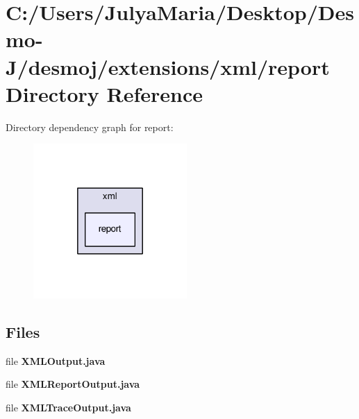\section{C\-:/\-Users/\-Julya\-Maria/\-Desktop/\-Desmo-\/\-J/desmoj/extensions/xml/report Directory Reference}
\label{dir_ec3be33de27843607b57d2c63dd0a21b}
Directory dependency graph for report\-:
\nopagebreak
\begin{figure}[H]
\begin{center}
\leavevmode
\includegraphics[width=166pt]{dir_ec3be33de27843607b57d2c63dd0a21b_dep}
\end{center}
\end{figure}
\subsection*{Files}
\begin{DoxyCompactItemize}
\item 
file {\bfseries X\-M\-L\-Output.\-java}
\item 
file {\bfseries X\-M\-L\-Report\-Output.\-java}
\item 
file {\bfseries X\-M\-L\-Trace\-Output.\-java}
\end{DoxyCompactItemize}
